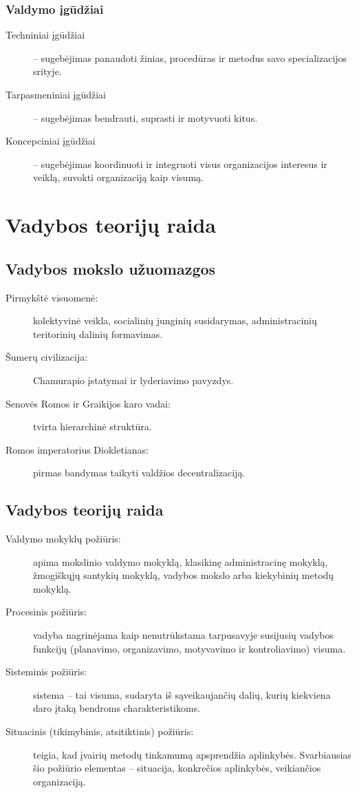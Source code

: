 \subsection{Valdymo įgūdžiai}

\begin{description}
  \item[Techniniai įgūdžiai] – sugebėjimas panaudoti žinias, procedūras
    ir metodus savo specializacijos srityje.
  \item[Tarpasmeniniai įgūdžiai] – sugebėjimas bendrauti, suprasti
    ir motyvuoti kitus.
  \item[Koncepciniai įgūdžiai] – sugebėjimas koordinuoti ir integruoti
    visus organizacijos interesus ir veiklą, suvokti organizaciją
    kaip visumą.
\end{description}

\chapter{Vadybos teorijų raida}

\section{Vadybos mokslo užuomazgos}

\begin{description}
  \item[Pirmykštė visuomenė:] kolektyvinė veikla, socialinių junginių
    susidarymas, administracinių teritorinių dalinių formavimas.
  \item[Šumerų civilizacija:] Chamurapio įstatymai ir lyderiavimo
    pavyzdys.
  \item[Senovės Romos ir Graikijos karo vadai:] tvirta hierarchinė
    struktūra.
  \item[Romos imperatorius Diokletianas:] pirmas bandymas taikyti
    valdžios decentralizaciją.
\end{description}

\section{Vadybos teorijų raida}

\begin{description}
  \item[Valdymo mokyklų požiūris:] apima mokslinio valdymo mokyklą, 
    klasikinę administracinę mokyklą, žmogiškųjų santykių mokyklą,
    vadybos mokslo arba kiekybinių metodų mokyklą.
  \item[Procesinis požiūris:] vadyba nagrinėjama kaip nenutrūkstama
    tarpusavyje susijusių vadybos funkcijų (planavimo, organizavimo,
    motyvavimo ir kontroliavimo) visuma.
  \item[Sisteminis požiūris:] sistema – tai visuma, sudaryta iš
    sąveikaujančių dalių, kurių kiekviena daro įtaką bendroms
    charakteristikoms.
  \item[Situacinis (tikimybinis, atsitiktinis) požiūris:] teigia,
    kad įvairių metodų tinkamumą apsprendžia aplinkybės. Svarbiausias
    šio požiūrio elementas – situacija, konkrečios aplinkybės,
    veikiančios organizaciją.
\end{description}

